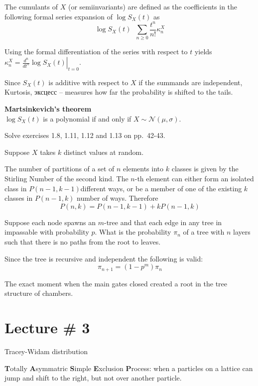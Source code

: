 \documentclass[a4paper]{article}
\newcommand{\induc}[1]{{\left . #1 \right \vert}}
\newcommand{\defn}{\mathop{\overset{\Delta}{=}}\nolimits}
\newcommand{\rus}[1]{\foreignlanguage{russian}{#1}}
\begin{document}
The cumulants of $X$ (or semiinvariants) are defined as the coefficients in the following formal series expansion of $\log S_X(t)$ as
\[\log S_X(t) \defn \sum_{n\geq 0} \frac{t^n}{n!} \kappa_n^X\]

Using the formal differentiation of the series with respect to $t$ yields
$\kappa_n^X = \induc{\frac{d^n}{dt^n} \log S_X(t)}_{t=0}$.

Since $S_X(t)$ is additive with respect to $X$ if the summands are independent,
Kurtosis, \rus{эксцесс} -- measures how far the probability is shifted to the tails.

\textbf{Martsinkevich's theorem}\hfill\\
$\log S_X(t)$ is a polynomial if and only if $X\sim\mathcal{N}(\mu,\sigma)$.


Solve exercises 1.8, 1.11, 1.12 and 1.13 on pp.~42-43.


Suppose $X$ takes $k$ distinct values at random. 



The number of partitions of a set of $n$ elements into $k$ classes is given by the Stirling Number of the second kind.
The $n$-th element can either form an isolated class in $P(n-1,k-1)$different ways,
or be a member of one of the existing $k$ classes in $P(n-1,k)$ number of ways.
Therefore \[P(n,k) = P(n-1,k-1) + k P(n-1,k)\]


Suppose each node spawns an $m$-tree and that each edge in any tree in impassable with probability $p$.
What is the probability $\pi_n$ of a tree with $n$ layers such that there is no paths from the root to leaves.

Since the tree is recursive and independent the following is valid:
\[\pi_{n+1} = (1 - p^m) \pi_n\]

The exact moment when the main gates closed created a root in the tree structure of chambers.


\section{Lecture \# 3} %
\label{sec:lecture_3}

Tracey-Widam distribution

\textbf{T}otally \textbf{A}symmatric \textbf{S}imple \textbf{E}xclusion \textbf{P}rocess: when a particles on a lattice can jump and shift to the right, but not over another particle.
\end{document}
